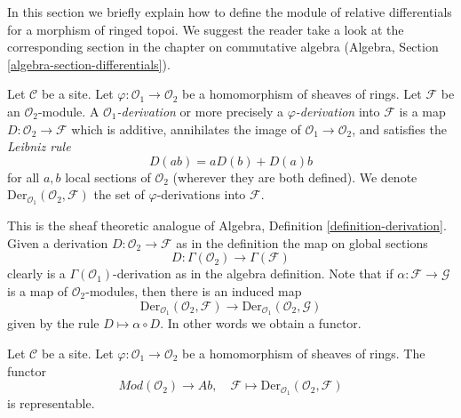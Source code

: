 \noindent
In this section we briefly explain how to define the module of relative
differentials for a morphism of ringed topoi.
We suggest the reader take a look at the corresponding section
in the chapter on commutative algebra
(Algebra, Section \ref{algebra-section-differentials}).

\begin{definition}
\label{definition-derivation}
Let $\mathcal{C}$ be a site. Let $\varphi : \mathcal{O}_1 \to \mathcal{O}_2$
be a homomorphism of sheaves of rings. Let $\mathcal{F}$
be an $\mathcal{O}_2$-module. A {\it $\mathcal{O}_1$-derivation}
or more precisely a {\it $\varphi$-derivation} into $\mathcal{F}$
is a map $D : \mathcal{O}_2 \to \mathcal{F}$ which is additive, annihilates
the image of $\mathcal{O}_1 \to \mathcal{O}_2$, and satisfies the
{\it Leibniz rule}
$$
D(ab) = aD(b) + D(a)b
$$
for all $a, b$ local sections of $\mathcal{O}_2$
(wherever they are both defined). We denote
$\text{Der}_{\mathcal{O}_1}(\mathcal{O}_2, \mathcal{F})$
the set of $\varphi$-derivations into $\mathcal{F}$.
\end{definition}

\noindent
This is the sheaf theoretic analogue of
Algebra, Definition \ref{definition-derivation}.
Given a derivation $D : \mathcal{O}_2 \to \mathcal{F}$
as in the definition the map on global sections
$$
D : \Gamma(\mathcal{O}_2) \longrightarrow \Gamma(\mathcal{F})
$$
clearly is a $\Gamma(\mathcal{O}_1)$-derivation as in
the algebra definition. Note that if $\alpha : \mathcal{F} \to \mathcal{G}$
is a map of $\mathcal{O}_2$-modules, then there is an induced map
$$
\text{Der}_{\mathcal{O}_1}(\mathcal{O}_2, \mathcal{F})
\longrightarrow
\text{Der}_{\mathcal{O}_1}(\mathcal{O}_2, \mathcal{G})
$$
given by the rule $D \mapsto \alpha \circ D$. In other words
we obtain a functor.

\begin{lemma}
\label{lemma-universal-module}
Let $\mathcal{C}$ be a site. Let $\varphi : \mathcal{O}_1 \to \mathcal{O}_2$
be a homomorphism of sheaves of rings. The functor
$$
\textit{Mod}(\mathcal{O}_2) \longrightarrow \textit{Ab}, \quad
\mathcal{F} \longmapsto \text{Der}_{\mathcal{O}_1}(\mathcal{O}_2, \mathcal{F})
$$
is representable.
\end{lemma}

